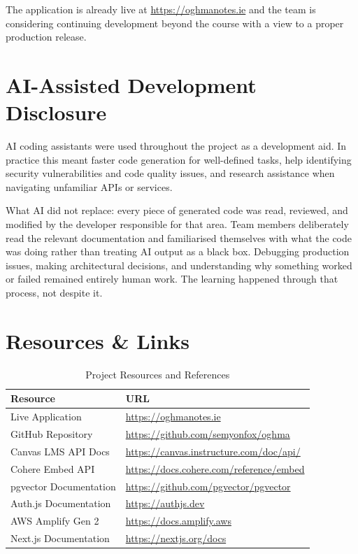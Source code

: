 \documentclass[12pt,a4paper]{article}
\begin{document}
The application is already live at \url{https://oghmanotes.ie} and the team is considering continuing development beyond the course with a view to a proper production release.

\section{AI-Assisted Development Disclosure}
\label{sec:ai}

AI coding assistants were used throughout the project as a development aid. In practice this meant faster code generation for well-defined tasks, help identifying security vulnerabilities and code quality issues, and research assistance when navigating unfamiliar APIs or services.

What AI did not replace: every piece of generated code was read, reviewed, and modified by the developer responsible for that area. Team members deliberately read the relevant documentation and familiarised themselves with what the code was doing rather than treating AI output as a black box. Debugging production issues, making architectural decisions, and understanding why something worked or failed remained entirely human work. The learning happened through that process, not despite it.

\section{Resources \& Links}
\label{sec:resources}

\begin{table}[H]
\centering
\begin{tabularx}{\textwidth}{lX}
\toprule
\textbf{Resource} & \textbf{URL} \\
\midrule
Live Application        & \url{https://oghmanotes.ie} \\
GitHub Repository       & \url{https://github.com/semyonfox/oghma} \\
Canvas LMS API Docs     & \url{https://canvas.instructure.com/doc/api/} \\
Cohere Embed API        & \url{https://docs.cohere.com/reference/embed} \\
pgvector Documentation  & \url{https://github.com/pgvector/pgvector} \\
Auth.js Documentation   & \url{https://authjs.dev} \\
AWS Amplify Gen 2       & \url{https://docs.amplify.aws} \\
Next.js Documentation   & \url{https://nextjs.org/docs} \\
\bottomrule
\end{tabularx}
\caption{Project Resources and References}
\label{tab:resources}
\end{table}
\end{document}
